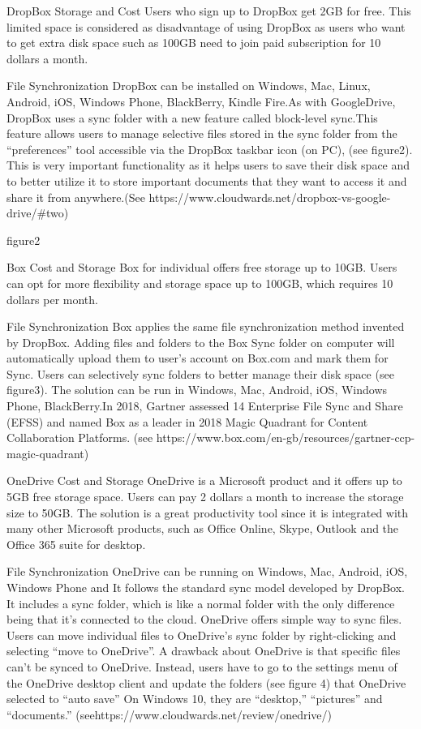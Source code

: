 \documentclass{article}
\begin{document}
DropBox
Storage and Cost
Users who sign up to DropBox get 2GB for free. This limited space is considered as disadvantage of using DropBox as users who want to get extra disk space such as 100GB need to join paid subscription for 10 dollars a month.

File Synchronization
DropBox can be installed on Windows, Mac, Linux, Android, iOS, Windows Phone, BlackBerry, Kindle Fire.As with GoogleDrive, DropBox uses a sync folder with a new feature called block-level sync.This feature allows users to manage selective files stored in the sync folder from the “preferences” tool accessible via the DropBox taskbar icon (on PC), (see figure2). This is very important functionality as it helps users to save their disk space and to better utilize it to store important documents that they want to access it and share it from anywhere.(See https://www.cloudwards.net/dropbox-vs-google-drive/#two)




figure2


Box
Cost and Storage
Box for individual offers free storage up to 10GB. Users can opt for more flexibility and storage space up to 100GB, which requires 10 dollars per month.

File Synchronization
Box applies the same file synchronization method invented by DropBox. Adding files and folders to the Box Sync folder on computer will automatically upload them to user’s account on Box.com and mark them for Sync. Users can selectively sync folders to better manage their disk space (see figure3). The solution can be run in Windows, Mac, Android, iOS, Windows Phone, BlackBerry.In 2018, Gartner assessed 14 Enterprise File Sync and Share (EFSS) and named Box as a leader in
2018 Magic Quadrant for Content Collaboration Platforms. (see  https://www.box.com/en-gb/resources/gartner-ccp-magic-quadrant)


OneDrive
Cost and Storage
OneDrive is a Microsoft product and it offers up to 5GB free storage space. Users can pay 2 dollars a month to increase the storage size to 50GB. The solution is a great productivity tool since it is integrated with many other Microsoft products, such as Office Online, Skype, Outlook and the Office 365 suite for desktop.

File Synchronization
OneDrive can be running on Windows, Mac, Android, iOS, Windows Phone and
It follows the standard sync model developed by DropBox. It includes a sync folder, which is like a normal folder with the only difference being that it’s connected to the cloud. OneDrive offers simple way to sync files. Users can move individual files to OneDrive’s sync folder by right-clicking and selecting “move to OneDrive”. A drawback about OneDrive is that specific files can’t be synced to OneDrive. Instead, users have to go to the settings menu of the OneDrive desktop client and update the folders (see figure 4) that OneDrive selected to “auto save” On Windows 10, they are “desktop,” “pictures” and “documents.” (seehttps://www.cloudwards.net/review/onedrive/)
\end{document}
